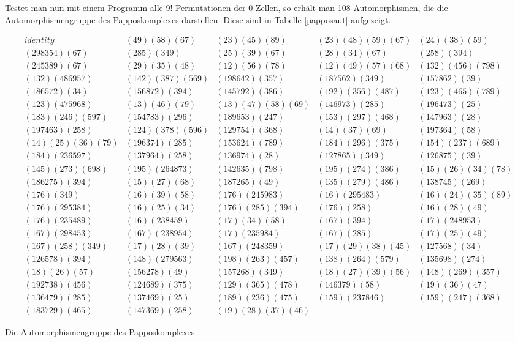 Testet man nun mit einem Programm alle 9! Permutationen der 0-Zellen, so
erhält man 108 Automorphismen, die die Automorphismengruppe des Papposkomplexes
darstellen. Diese sind in Tabelle \ref{papposaut} aufgezeigt.

\begin{table}%
{\footnotesize
$$
\begin{array}{lllll}
identity&(49)(58)(67)&(23)(45)(89)&(23)(48)(59)(67)&(24)(38)(59)\\
(298354)(67)&(285)(349)&(25)(39)(67)&(28)(34)(67)&(258)(394)\\
(245389)(67)&(29)(35)(48)&(12)(56)(78)&(12)(49)(57)(68)&(132)(456)(798)\\
(132)(486957)&(142)(387)(569)&(198642)(357)&(187562)(349)&(157862)(39)\\
(186572)(34)&(156872)(394)&(145792)(386)&(192)(356)(487)&(123)(465)(789)\\
(123)(475968)&(13)(46)(79)&(13)(47)(58)(69)&(146973)(285)&(196473)(25)\\
(183)(246)(597)&(154783)(296)&(189653)(247)&(153)(297)(468)&(147963)(28)\\
(197463)(258)&(124)(378)(596)&(129754)(368)&(14)(37)(69)&(197364)(58)\\
(14)(25)(36)(79)&(196374)(285)&(153624)(789)&(184)(296)(375)&(154)(237)(689)\\
(184)(236597)&(137964)(258)&(136974)(28)&(127865)(349)&(126875)(39)\\
(145)(273)(698)&(195)(264873)&(142635)(798)&(195)(274)(386)&(15)(26)(34)(78)\\
(186275)(394)&(15)(27)(68)&(187265)(49)&(135)(279)(486)&(138745)(269)\\
(176)(349)&(16)(39)(58)&(176)(245983)&(16)(295483)&(16)(24)(35)(89)\\
(176)(295384)&(16)(25)(34)&(176)(285)(394)&(176)(258)&(16)(28)(49)\\
(176)(235489)&(16)(238459)&(17)(34)(58)&(167)(394)&(17)(248953)\\
(167)(298453)&(167)(238954)&(17)(235984)&(167)(285)&(17)(25)(49)\\
(167)(258)(349)&(17)(28)(39)&(167)(248359)&(17)(29)(38)(45)&(127568)(34)\\
(126578)(394)&(148)(279563)&(198)(263)(457)&(138)(264)(579)&(135698)(274)\\
(18)(26)(57)&(156278)(49)&(157268)(349)&(18)(27)(39)(56)&(148)(269)(357)\\
(192738)(456)&(124689)(375)&(129)(365)(478)&(146379)(58)&(19)(36)(47)\\
(136479)(285)&(137469)(25)&(189)(236)(475)&(159)(237846)&(159)(247)(368)\\
(183729)(465)&(147369)(258)&(19)(28)(37)(46)&&
\end{array}$$}
\caption{Die Automorphismengruppe des Papposkomplexes}
\label{papposaut}
\end{table}


